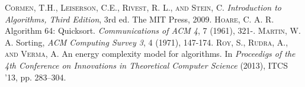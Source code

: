 \documentclass[a4paper, 10pt,twocolumn]{article} %
\begin{document}
\begin{thebibliography}{9}
\textsc{Cormen, T.H., Leiserson, C.E., Rivest, R. L., and Stein, C.} \textit{Introduction to Algorithms, Third Edition}, 3rd ed. The MIT Press, 2009.
\textsc{Hoare, C. A. R.} Algorithm 64: Quicksort. \textit{Communications of ACM 4}, 7 (1961), 321-.
\textsc{Martin, W. A.} Sorting, \textit{ACM Computing Survey 3}, 4 (1971), 147-174.
\textsc{Roy, S., Rudra, A., and Verma, A.} An energy complexity model for algorithms. In \textit{Proceedigs of the 4th Conference on Innovations in Theoretical Computer Science} (2013), ITCS '13, pp. 283--304.
\end{thebibliography}
\end{document}
